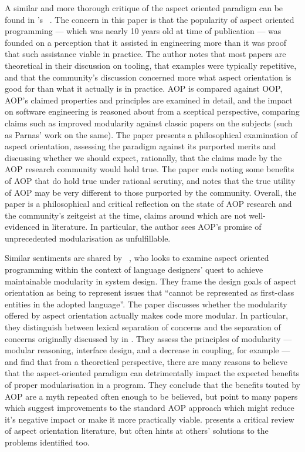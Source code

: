 A similar and more thorough critique of the aspect oriented paradigm can be
found in \citeauthor{steimann06paradoxical}'s
~\cite{steimann06paradoxical}. The concern in
this paper is that the popularity of aspect oriented programming --- which was
nearly 10 years old at time of publication --- was founded on a perception that
it assisted in engineering more than it was proof that such assistance viable in
practice. The author notes that most papers are theoretical in their discussion
on tooling, that examples were typically repetitive, and that the community's
discussion concerned more what aspect orientation is good for than what it
actually is in practice. AOP is compared against OOP, AOP's claimed properties
and principles are examined in detail, and the impact on software engineering is
reasoned about from a sceptical perspective, comparing claims such as improved
modularity against classic papers on the subjects (such as Parnas' work on the
same). The paper presents a philosophical examination of aspect orientation,
assessing the paradigm against its purported merits and discussing whether we
should expect, rationally, that the claims made by the AOP research community
would hold true. The paper ends noting some benefits of AOP that do hold true
under rational scrutiny, and notes that the true utility of AOP may be very
different to those purported by the community. Overall, the paper is a
philosophical and critical reflection on the state of AOP research and the
community's zeitgeist at the time, claims around which are not well-evidenced in
literature. In particular, the author sees AOP's promise of unprecedented
modularisation as unfulfillable. 

Similar sentiments are shared by
\citeauthor{przybylek2010wrong}~\cite{przybylek2010wrong}, who looks to examine aspect oriented
programming within the context of language designers' quest to achieve
maintainable modularity in system design. They frame the design goals of aspect
orientation as being to represent issues that ``cannot be represented as
first-class entities in the adopted language''. The paper discusses whether the
modularity offered by aspect orientation actually makes code more modular. In
particular, they distinguish between lexical separation of concerns and the
separation of concerns originally discussed by
\citeauthor{djikstra_scientific_thought} in
. They assess the principles of
modularity --- modular reasoning, interface design, and a decrease in coupling,
for example --- and find that from a theoretical perspective, there are many
reasons to believe that the aspect-oriented paradigm can detrimentally impact
the expected benefits of proper modularisation in a program. They conclude that
the benefits touted by AOP are a myth repeated often enough to be believed, but
point to many papers which suggest improvements to the standard AOP approach
which might reduce it's negative impact or make it more practically viable.
\citeauthor{przybylek2010wrong} presents a critical review of aspect orientation
literature, but often hints at others' solutions to the problems identified too.


